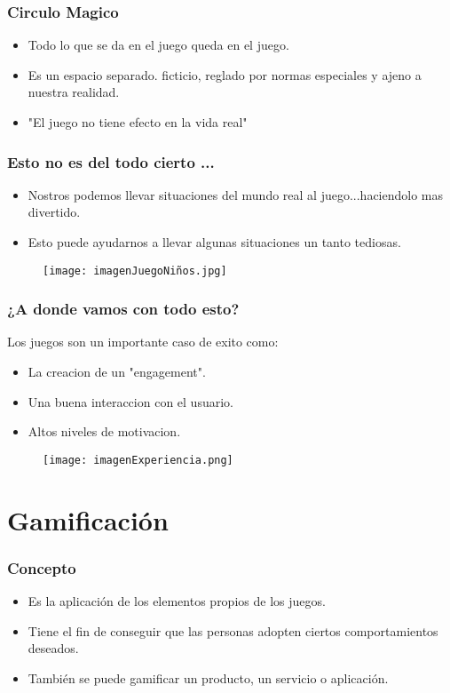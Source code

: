 \documentclass[11pt]{beamer}
\begin{document}
\begin{frame}
\frametitle{Circulo Magico}
\begin{itemize}
    \item Todo lo que se da en el juego queda en el juego.
    \item Es un espacio separado. ficticio, reglado por normas especiales y ajeno a nuestra realidad.
    \item "El juego no tiene efecto en la vida real"
\end{itemize}
\end{frame}


\begin{frame}
\frametitle{Esto no es del todo cierto ...}
\begin{itemize}
    \item Nostros podemos llevar situaciones del mundo real al juego...haciendolo mas divertido.
    \item Esto puede ayudarnos a llevar algunas situaciones un tanto tediosas.
\end{itemize}
\begin{figure}
    \centering
    \texttt{[image: imagenJuegoNiños.jpg]}
    \label{fig:my_label}
\end{figure}
\end{frame}


\begin{frame}
\frametitle{¿A donde vamos con todo esto?}
Los juegos son un importante caso de exito como:
\begin{itemize}
    \item La creacion de un "engagement".
    \item Una buena interaccion con el usuario.
    \item Altos niveles de motivacion.
\end{itemize}
\begin{figure}
    \centering
    \texttt{[image: imagenExperiencia.png]}
    \label{fig:my_label}
\end{figure}
\end{frame}

\section{Gamificación}
\begin{frame}
\frametitle{Concepto}
\begin{itemize}
    \item Es la aplicación de los elementos propios de los juegos.
    \item Tiene el fin de conseguir que las personas adopten ciertos comportamientos deseados.
    \item También se puede gamificar un producto, un servicio o aplicación.
\end{itemize}
\end{frame}
\end{document}
